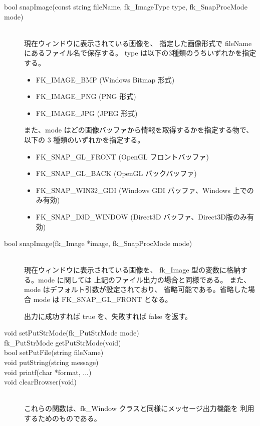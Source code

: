 \begin{description}
 \item[\hspace*{0.6cm}bool snapImage(const string fileName,
			fk\_ImageType type,
			fk\_SnapProcMode mode)] ~ \\
	現在ウィンドウに表示されている画像を、
	指定した画像形式で fileName にあるファイル名で保存する。
	type は以下の3種類のうちいずれかを指定する。
	\begin{itemize}
	 \item FK\_IMAGE\_BMP (Windows Bitmap 形式)
	 \item FK\_IMAGE\_PNG (PNG 形式)
	 \item FK\_IMAGE\_JPG (JPEG 形式)
	\end{itemize}
	また、mode はどの画像バッファから情報を取得するかを指定する物で、
	以下の 3 種類のいずれかを指定する。
	\begin{itemize}
	 \item FK\_SNAP\_GL\_FRONT (OpenGL フロントバッファ)
	 \item FK\_SNAP\_GL\_BACK (OpenGL バックバッファ)
	 \item FK\_SNAP\_WIN32\_GDI
	 (Windows GDI バッファ、Windows 上でのみ有効)
	 \item FK\_SNAP\_D3D\_WINDOW
	(Direct3D バッファ、Direct3D版のみ有効)
	\end{itemize}

 \item[\hspace*{0.6cm}bool snapImage(fk\_Image *image,
				fk\_SnapProcMode mode)] ~ \\
	現在ウィンドウに表示されている画像を、
	fk\_Image 型の変数に格納する。mode に関しては
	上記のファイル出力の場合と同様である。
	また、mode はデフォルト引数が設定されており、
	省略可能である。省略した場合 mode は FK\_SNAP\_GL\_FRONT となる。

	出力に成功すれば true を、失敗すれば false を返す。
 \item[\hspace*{0.6cm}void setPutStrMode(fk\_PutStrMode mode)]
 \item[\hspace*{0.6cm}fk\_PutStrMode getPutStrMode(void)]
 \item[\hspace*{0.6cm}bool setPutFile(string fileName)]
 \item[\hspace*{0.6cm}void putString(string message)]
 \item[\hspace*{0.6cm}void printf(char *format, ...)]
 \item[\hspace*{0.6cm}void clearBrowser(void)] ~ \\
	これらの関数は、fk\_Window クラスと同様にメッセージ出力機能を
	利用するためのものである。

\end{description}
